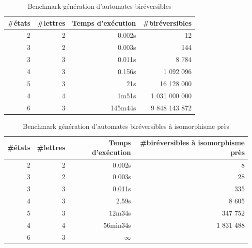 \documentclass[11pt,a4paper]{article}
\begin{document}
\begin{table}[h!]
  \begin{center}
    \begin{threeparttable}
      \begin{tabular}{|rrrr|}
        \hline
        \#états & \#lettres & Temps d'exécution & \#biréversibles \\ [0.5ex]
        \hline\hline
        2 & 2 & 0.002s & 12 \\
        \hline
        3 & 2 & 0.003s & 144 \\
        \hline
        3 & 3 & 0.011s & 8 784 \\
        \hline
        4 & 3 & 0.156s & 1 092 096 \\
        \hline
        5 & 3 & 21s    & 16 128 000 \\
        \hline
        4 & 4 & 1m51s  & 1 031 000 000 \\
        \hline
        6 & 3 & 145m44s& 9 848 143 872 \\
        \hline
      \end{tabular}

      \caption{Benchmark génération d'automates biréversibles}
    \end{threeparttable}
  \end{center}
\end{table}


\begin{table}[h!]
  \begin{center}
    \begin{threeparttable}
      \begin{tabular}{|rrrr|}
        \hline
        \#états & \#lettres & Temps d'exécution & \#biréversibles à isomorphisme près\\ [0.5ex]
        \hline\hline
        2 & 2 & 0.002s & 8 \\
        \hline
        3 & 2 & 0.003s & 28 \\
        \hline
        3 & 3 & 0.011s & 335  \\
        \hline
        4 & 3 & 2.59s & 8 605 \\
        \hline
        5 & 3 & 12m34s    & 347 752 \\
        \hline
        4 & 4 & 56min34s  & 1 831 488 \\
        \hline
        6 & 3 & $\infty$  &  \\
        \hline
      \end{tabular}

      \caption{Benchmark génération d'automates biréversibles à isomorphisme près}
    \end{threeparttable}
  \end{center}
\end{table}
\end{document}
